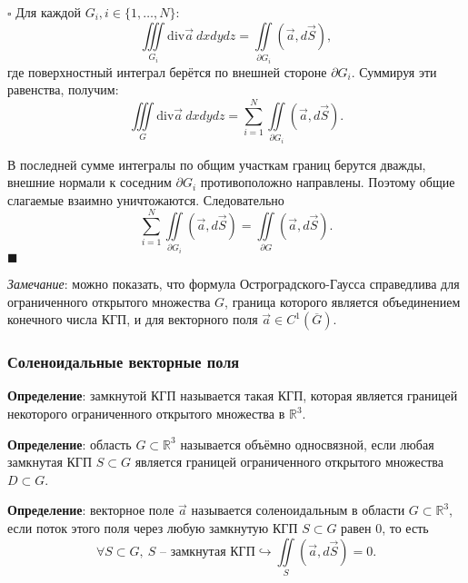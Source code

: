 \documentclass[12pt, a4paper, reqno]{article}
\begin{document}
    $\square$
    Для каждой $G_i, i \in \{1, \ldots, N\}$:
    \begin{equation*}
        \iiint\limits_{G_i}\text{div}\vec{a}\ dx dy dz = \iint\limits_{\partial G_i}(\vec{a}, d\vec{S}),
    \end{equation*}
    где поверхностный интеграл берётся по внешней стороне $\partial G_i$. Суммируя эти равенства,
    получим:
    \begin{equation*}
        \iiint\limits_{G}\text{div}\vec{a}\ dx dy dz =
        \sum\limits_{i = 1}^{N} \iint\limits_{\partial G_i}(\vec{a}, d\vec{S}).
    \end{equation*}

    В последней сумме интегралы по общим участкам границ берутся дважды, внешние нормали к соседним
    $\partial G_i$ противоположно направлены. Поэтому общие слагаемые взаимно уничтожаются.
    Следовательно
    \begin{equation*}
        \sum\limits_{i = 1}^{N} \iint\limits_{\partial G_i}(\vec{a}, d\vec{S}) =
        \iint\limits_{\partial G}(\vec{a}, d\vec{S}).
    \end{equation*}
    $\blacksquare$

    \textit{Замечание}: можно показать, что формула Остроградского-Гаусса справедлива для ограниченного
    открытого множества $G$, граница которого является объединением конечного числа КГП, и для
    векторного поля $\vec{a} \in C^1(\overline{G})$.

    \subsubsection{Соленоидальные векторные поля}

    \textbf{Определение}: замкнутой КГП называется такая КГП, которая является границей некоторого
    ограниченного открытого множества в $\mathbb{R}^3$.

    \textbf{Определение}: область $G \subset \mathbb{R}^3$ называется объёмно односвязной, если
    любая замкнутая КГП $S \subset G$ является границей ограниченного открытого множества $D \subset G$.

    \textbf{Определение}: векторное поле $\vec{a}$ называется соленоидальным в области
    $G \subset \mathbb{R}^3$, если поток этого поля через любую замкнутую КГП $S \subset G$ равен 0,
    то есть
    \begin{equation*}
        \forall S \subset G,\ S\text{ -- замкнутая КГП} \hookrightarrow \iint\limits_{S} (\vec{a}, d\vec{S}) = 0.
    \end{equation*}
\end{document}

